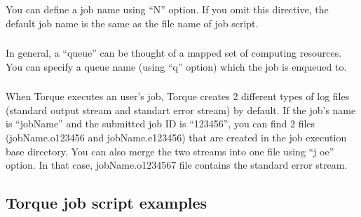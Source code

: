 \documentclass[a4paper,10pt,english]{sphinxmanual}
\begin{document}
\subsubsection{}
\label{\detokenize{guide:job-name}}
\sphinxAtStartPar
You can define a job name using “\sphinxhyphen{}N” option. If you omit this directive, the default job name is the same as the file name of job script.

\begin{sphinxVerbatim}[commandchars=\\\{\}]
\end{sphinxVerbatim}


\subsubsection{}
\label{\detokenize{guide:queue-name}}
\sphinxAtStartPar
In general, a “queue” can be thought of a mapped set of computing resources. You can specify a queue name (using “\sphinxhyphen{}q” option) which the job is enqueued to.

\begin{sphinxVerbatim}[commandchars=\\\{\}]
\end{sphinxVerbatim}


\subsubsection{}
\label{\detokenize{guide:job-log-files}}
\sphinxAtStartPar
When Torque executes an user’s job, Torque creates 2 different types of log files (standard output stream and standart error stream) by default. If the job’s name is “jobName” and the submitted job ID is “123456”, you can find 2 files (jobName.o123456 and jobName.e123456) that are created in the job execution base directory.
You can also merge the two streams into one file using “\sphinxhyphen{}j oe” option. In that case, jobName.o1234567 file contains the standard error stream.

\begin{sphinxVerbatim}[commandchars=\\\{\}]
\end{sphinxVerbatim}


\subsection{Torque job script examples}
\label{\detokenize{guide:torque-job-script-examples}}
\end{document}
